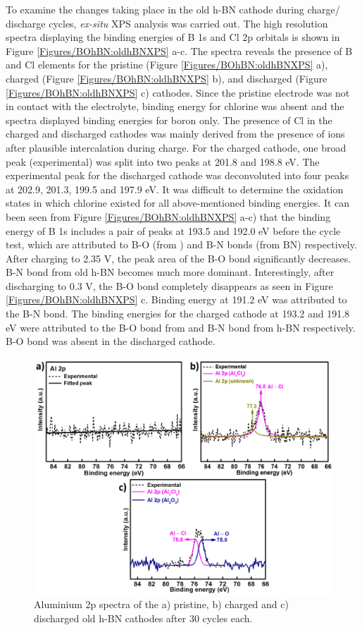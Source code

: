 To examine the changes taking place in the old h-BN cathode during charge/ discharge cycles, \textit{ex-situ} XPS analysis was carried out. The high resolution spectra displaying the binding energies of B 1s and Cl 2p orbitals is shown in Figure \ref{Figures/BOhBN:oldhBNXPS} a-c. The spectra reveals the presence of B and Cl elements for the pristine (Figure \ref{Figures/BOhBN:oldhBNXPS} a), charged (Figure \ref{Figures/BOhBN:oldhBNXPS} b), and discharged (Figure \ref{Figures/BOhBN:oldhBNXPS} c) cathodes. Since the pristine electrode was not in contact with the electrolyte, binding energy for chlorine was absent and the spectra displayed binding energies for boron only. The presence of Cl in the charged and discharged cathodes was mainly derived from the presence of  ions after plausible intercalation during charge. For the charged cathode, one broad peak (experimental) was split into two peaks at 201.8 and 198.8 eV. The experimental peak for the discharged cathode was deconvoluted into four peaks at 202.9, 201.3, 199.5 and 197.9 eV. It was difficult to determine the oxidation states in which chlorine existed for all above-mentioned binding energies. It can been seen from Figure \ref{Figures/BOhBN:oldhBNXPS} a-c) that the binding energy of B 1s includes a pair of peaks at 193.5 and 192.0 eV before the cycle test, which are attributed to B-O (from ) and B-N bonds (from BN) respectively. After charging to 2.35 V, the peak area of the B-O bond significantly decreases. B-N bond from old h-BN becomes much more dominant. Interestingly, after discharging to 0.3 V, the B-O bond completely disappears as seen in Figure \ref{Figures/BOhBN:oldhBNXPS} c. Binding energy at 191.2 eV was attributed to the B-N bond. The binding energies for the charged cathode at 193.2 and 191.8 eV were attributed to the B-O bond from  and B-N bond from h-BN respectively. B-O bond was absent in the discharged cathode. 

\begin{figure}[tbh!]
\centering
\includegraphics[width=\textwidth]{Figures/BOhBN/hBNAlXPS}
\caption{Aluminium 2p spectra of the a) pristine, b) charged and c) discharged old h-BN cathodes after 30 cycles each. }
\label{Figures/BOhBN:hBNAlXPS}
\end{figure}

